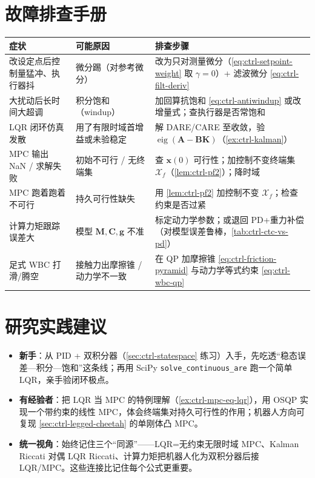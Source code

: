 \section*{故障排查手册}
\begin{table}[H]\centering\small
\begin{tabular}{p{} p{} p{}}
\toprule
症状 & 可能原因 & 排查步骤 \\
\midrule
改设定点后控制量猛冲、执行器抖 & 微分踢（对参考微分） & 改为只对测量微分（\cref{eq:ctrl-setpoint-weight} 取 $\gamma=0$）+ 滤波微分 \cref{eq:ctrl-filt-deriv} \\
大扰动后长时间大超调 & 积分饱和（windup） & 加回算抗饱和 \cref{eq:ctrl-antiwindup} 或改增量式；查执行器是否常饱和 \\
LQR 闭环仿真发散 & 用了有限时域首增益或未验稳定 & 解 DARE/CARE 至收敛，验 $\operatorname{eig}(\mathbf{A}-\mathbf{B}\mathbf{K})$（\cref{ex:ctrl-kalman}） \\
MPC 输出 NaN / 求解失败 & 初始不可行 / 无终端集 & 查 $\mathbf{x}(0)$ 可行性；加控制不变终端集 $\mathcal{X}_f$（\cref{lem:ctrl-pf2}）；降时域 \\
MPC 跑着跑着不可行 & 持久可行性缺失 & 用 \cref{lem:ctrl-pf2} 加控制不变 $\mathcal{X}_f$；检查约束是否过紧 \\
计算力矩跟踪误差大 & 模型 $\mathbf{M},\mathbf{C},\mathbf{g}$ 不准 & 标定动力学参数；或退回 PD+重力补偿（对模型误差鲁棒，\cref{tab:ctrl-ctc-vs-pd}） \\
足式 WBC 打滑/腾空 & 接触力出摩擦锥 / 动力学不一致 & 在 QP 加摩擦锥 \cref{eq:ctrl-friction-pyramid} 与动力学等式约束 \cref{eq:ctrl-wbc-qp} \\
\bottomrule
\end{tabular}
\end{table}

\section*{研究实践建议}
\begin{itemize}
  \item \textbf{新手}：从 PID + 双积分器（\cref{sec:ctrl-statespace} 练习）入手，先吃透“稳态误差—积分—饱和”这条线；再用 SciPy \texttt{solve\_continuous\_are} 跑一个简单 LQR，亲手验闭环极点。
  \item \textbf{有经验者}：把 LQR 当 MPC 的特例理解（\cref{ex:ctrl-mpc-eq-lqr}），用 OSQP 实现一个带约束的线性 MPC，体会终端集对持久可行性的作用；机器人方向可复现 \cref{sec:ctrl-legged-cheetah} 的单刚体凸 MPC。
  \item \textbf{统一视角}：始终记住三个“同源”——LQR=无约束无限时域 MPC、Kalman Riccati 对偶 LQR Riccati、计算力矩把机器人化为双积分器后接 LQR/MPC。这些连接比记住每个公式更重要。
\end{itemize}

